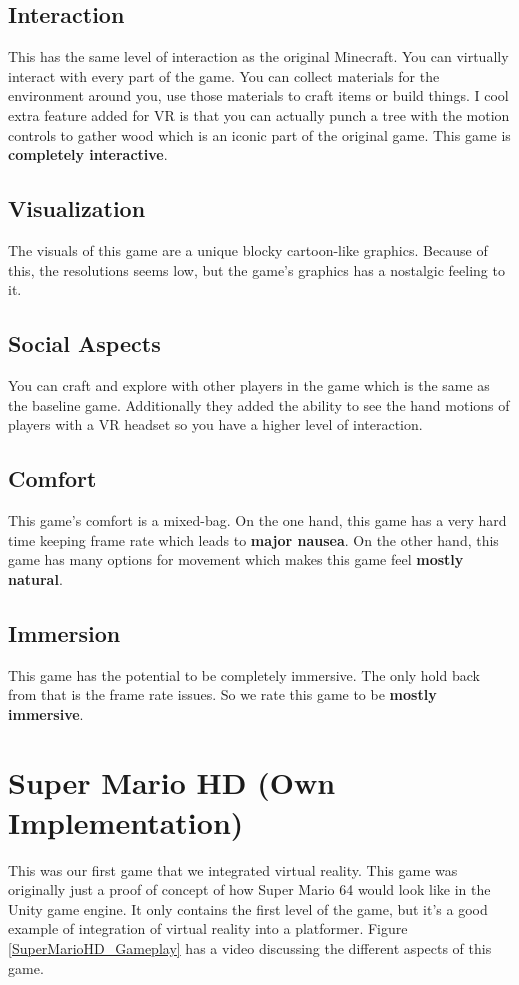 \documentclass[journal]{IEEEtran}
\begin{document}
\subsection{Interaction}
This has the same level of interaction as the original Minecraft. You can virtually interact with every part of the game. You can collect materials for the environment around you, use those materials to craft items or build things. I cool extra feature added for VR is that you can actually punch a tree with the motion controls to gather wood which is an iconic part of the original game. This game is \textbf{completely interactive}.

\subsection{Visualization}
The visuals of this game are a unique blocky cartoon-like graphics. Because of this, the resolutions seems low, but the game's graphics has a nostalgic feeling to it. 

\subsection{Social Aspects}
You can craft and explore with other players in the game which is the same as the baseline game. Additionally they added the ability to see the hand motions of players with a VR headset so you have a higher level of interaction.

\subsection{Comfort}
This game's comfort is a mixed-bag. On the one hand, this game has a very hard time keeping frame rate which leads to \textbf{major nausea}. On the other hand, this game has many options for movement which makes this game feel \textbf{mostly natural}.
\subsection{Immersion}
This game has the potential to be completely immersive. The only hold back from that is the frame rate issues. So we rate this game to be \textbf{mostly immersive}.

\section{Super Mario HD (Own Implementation)}
This was our first game that we integrated virtual reality. This game was originally just a proof of concept of how Super Mario 64 would look like in the Unity game engine. It only contains the first level of the game, but it's a good example of integration of virtual reality into a platformer. Figure \ref{SuperMarioHD_Gameplay} has a video discussing the different aspects of this game. 
  
\end{document}
